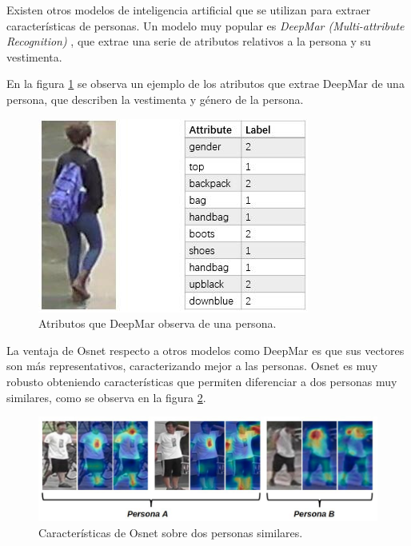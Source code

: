 
Existen otros modelos de inteligencia artificial que se utilizan para extraer características de personas. Un modelo muy popular es \textit{DeepMar (Multi-attribute Recognition)} \citep{DEEPMAR}, que extrae una serie de atributos relativos a la persona y su vestimenta. 

En la figura \ref{fig:deepmar} se observa un ejemplo de los atributos que extrae DeepMar de una persona, que describen la vestimenta y  género de la persona.

\begin{figure}[ht]
	\centering
	\includegraphics[scale=.8]{./Figures/deepmar.png}
	\caption{Atributos que DeepMar observa de una persona\protect\footnotemark.}
	\label{fig:deepmar}
\end{figure}



\newpage

La ventaja de Osnet respecto a otros modelos como DeepMar es que sus vectores son más representativos, caracterizando mejor a las personas. Osnet es muy robusto obteniendo características que permiten diferenciar a dos personas muy similares, como se observa en la figura \ref{fig:osnetDosPersonas}.

\begin{figure}[ht]
	\centering
	\includegraphics[scale=0.5]{./Figures/osnetDosPersonas.jpg}
	\caption{Características de Osnet sobre dos personas similares\protect\footnotemark.}
	\label{fig:osnetDosPersonas}
\end{figure}

